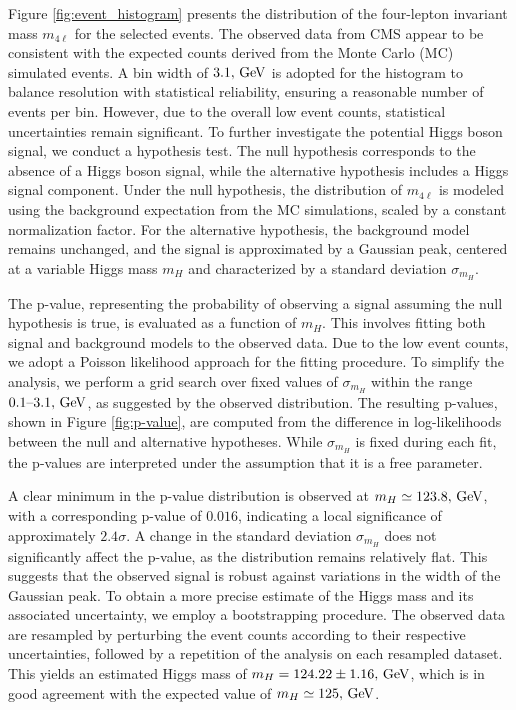 \documentclass[aps,twocolumn,secnumarabic,balancelastpage,amsmath,amssymb,nofootinbib,floatfix]{revtex4-1}
\newcommand{\GeV}{\,{\rm GeV}}
\begin{document}
Figure \ref{fig:event_histogram} presents the distribution of the four-lepton invariant mass $m_{4\ell}$ for the selected events. The observed data from CMS appear to be consistent with the expected counts derived from the Monte Carlo (MC) simulated events. A bin width of $3.1,\GeV$ is adopted for the histogram to balance resolution with statistical reliability, ensuring a reasonable number of events per bin. However, due to the overall low event counts, statistical uncertainties remain significant. To further investigate the potential Higgs boson signal, we conduct a hypothesis test. The null hypothesis corresponds to the absence of a Higgs boson signal, while the alternative hypothesis includes a Higgs signal component. Under the null hypothesis, the distribution of $m_{4\ell}$ is modeled using the background expectation from the MC simulations, scaled by a constant normalization factor. For the alternative hypothesis, the background model remains unchanged, and the signal is approximated by a Gaussian peak, centered at a variable Higgs mass $m_H$ and characterized by a standard deviation $\sigma_{m_H}$.

The p-value, representing the probability of observing a signal assuming the null hypothesis is true, is evaluated as a function of $m_H$. This involves fitting both signal and background models to the observed data. Due to the low event counts, we adopt a Poisson likelihood approach for the fitting procedure. To simplify the analysis, we perform a grid search over fixed values of $\sigma_{m_H}$ within the range $0.1 \text{--} 3.1,\GeV$, as suggested by the observed distribution. The resulting p-values, shown in Figure \ref{fig:p-value}, are computed from the difference in log-likelihoods between the null and alternative hypotheses. While $\sigma_{m_H}$ is fixed during each fit, the p-values are interpreted under the assumption that it is a free parameter.

A clear minimum in the p-value distribution is observed at $m_H \simeq 123.8,\GeV$, with a corresponding p-value of $0.016$, indicating a local significance of approximately $2.4\sigma$. A change in the standard deviation $\sigma_{m_H}$ does not significantly affect the p-value, as the distribution remains relatively flat. This suggests that the observed signal is robust against variations in the width of the Gaussian peak. To obtain a more precise estimate of the Higgs mass and its associated uncertainty, we employ a bootstrapping procedure. The observed data are resampled by perturbing the event counts according to their respective uncertainties, followed by a repetition of the analysis on each resampled dataset. This yields an estimated Higgs mass of $m_H = 124.22 \pm 1.16,\GeV$, which is in good agreement with the expected value of $m_H \simeq 125,\GeV$.
\end{document}
